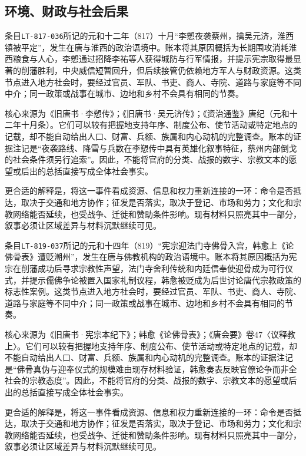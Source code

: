 \subsection{环境、财政与社会后果}

条目\texttt{LT-817-036}所记的元和十二年（817）十月“李愬夜袭蔡州，擒吴元济，淮西镇被平定”，发生在唐与淮西的政治语境中。账本将其原因概括为长期围攻消耗淮西粮食与人心，李愬通过招降李祐等人获得城防与行军情报，并提示宪宗取得最显著的削藩胜利，中央威信短暂回升，但后续接管仍依赖地方军人与财政资源。这类节点进入地方社会时，要经过官员、军队、书吏、商人、寺院、道路与家庭等不同中介；同一政策或战事在城市、边地和乡村不会具有相同的节奏。

核心来源为《旧唐书·李愬传》；《旧唐书·吴元济传》；《资治通鉴》唐纪（元和十二年十月条）。它们可以较有把握地支持年序、制度公布、使节活动或特定地点的记载，却不能自动给出人口、财富、兵额、族属和内心动机的完整调查。账本的证据注记是“夜袭路线、降雪与兵数在李愬传中具有英雄化叙事特征，蔡州内部倒戈的社会条件须另行追索”。因此，不能将官府的分类、战报的数字、宗教文本的愿望或后出的总括直接写成全体社会事实。

更合适的解释是，将这一事件看成资源、信息和权力重新连接的一环：命令是否抵达，取决于交通和地方协作；征发是否落实，取决于登记、市场和劳力；文化和宗教网络能否延续，也受战争、迁徙和赞助条件影响。现有材料只照亮其中一部分，叙事必须让区域差异与材料沉默继续可见。

条目\texttt{LT-819-037}所记的元和十四年（819）“宪宗迎法门寺佛骨入宫，韩愈上《论佛骨表》遭贬潮州”，发生在唐与佛教机构的政治语境中。账本将其原因概括为宪宗在削藩成功后寻求宗教性声望，法门寺舍利传统和内廷信奉使迎骨成为可行仪式，并提示儒佛争论被置入国家礼制议程，韩愈被贬成为后世讨论唐代宗教政策的标志性案例。这类节点进入地方社会时，要经过官员、军队、书吏、商人、寺院、道路与家庭等不同中介；同一政策或战事在城市、边地和乡村不会具有相同的节奏。

核心来源为《旧唐书·宪宗本纪下》；韩愈《论佛骨表》；《唐会要》卷47〈议释教上〉。它们可以较有把握地支持年序、制度公布、使节活动或特定地点的记载，却不能自动给出人口、财富、兵额、族属和内心动机的完整调查。账本的证据注记是“佛骨真伪与迎奉仪式的规模难由现存材料验证，韩愈奏表反映官僚论争而非全社会的宗教态度”。因此，不能将官府的分类、战报的数字、宗教文本的愿望或后出的总括直接写成全体社会事实。

更合适的解释是，将这一事件看成资源、信息和权力重新连接的一环：命令是否抵达，取决于交通和地方协作；征发是否落实，取决于登记、市场和劳力；文化和宗教网络能否延续，也受战争、迁徙和赞助条件影响。现有材料只照亮其中一部分，叙事必须让区域差异与材料沉默继续可见。

